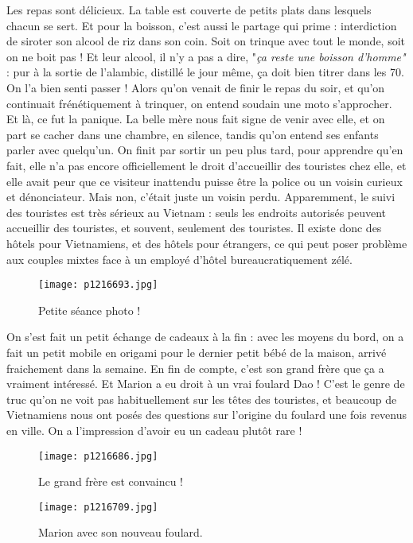 \documentclass{book}
\begin{document}
Les repas sont délicieux. La table est couverte de petits plats dans lesquels chacun se sert. Et pour la boisson, c'est aussi le partage qui prime : interdiction de siroter son alcool de riz dans son coin. Soit on trinque avec tout le monde, soit on ne boit pas ! Et leur alcool, il n'y a pas a dire, "\emph{ça reste une boisson d'homme"} : pur à la sortie de l'alambic, distillé le jour même, ça doit bien titrer dans les 70\textdegree . On l'a bien senti passer ! Alors qu'on venait de finir le repas du soir, et qu'on continuait frénétiquement à trinquer, on entend soudain une moto s'approcher. Et là, ce fut la panique. La belle mère nous fait signe de venir avec elle, et on part se cacher dans une chambre, en silence, tandis qu'on entend ses enfants parler avec quelqu'un. On finit par sortir un peu plus tard, pour apprendre qu'en fait, elle n'a pas encore officiellement le droit d'accueillir des touristes chez elle, et elle avait peur que ce visiteur inattendu puisse être la police ou un voisin curieux et dénonciateur. Mais non, c'était juste un voisin perdu. Apparemment, le suivi des touristes est très sérieux au Vietnam : seuls les endroits autorisés peuvent accueillir des touristes, et souvent, seulement des touristes. Il existe donc des hôtels pour Vietnamiens, et des hôtels pour étrangers, ce qui peut poser problème aux couples mixtes face à un employé d'hôtel bureaucratiquement zélé.


\begin{figure}[h]
\centering
\texttt{[image: p1216693.jpg]}
\caption*{Petite séance photo !}
\end{figure}

On s'est fait un petit échange de cadeaux à la fin : avec les moyens du bord, on a fait un petit mobile en origami pour le dernier petit bébé de la maison, arrivé fraichement dans la semaine. En fin de compte, c'est son grand frère que ça a vraiment intéressé. Et Marion a eu droit à un vrai foulard Dao ! C'est le genre de truc qu'on ne voit pas habituellement sur les têtes des touristes, et beaucoup de Vietnamiens nous ont posés des questions sur l'origine du foulard une fois revenus en ville. On a l'impression d'avoir eu un cadeau plutôt rare !


\begin{figure}[h]
\centering
\texttt{[image: p1216686.jpg]}
\caption*{Le grand frère est convaincu !}
\end{figure}


\begin{figure}[h]
\centering
\texttt{[image: p1216709.jpg]}
\caption*{Marion avec son nouveau foulard.}
\end{figure}
\end{document}
